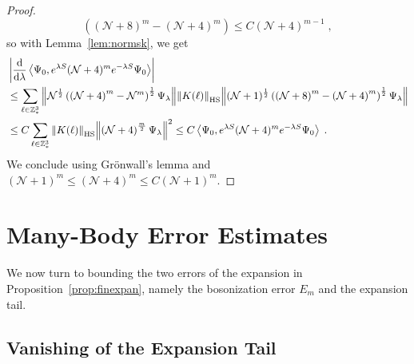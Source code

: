 \documentclass[12pt,a4paper]{article}
\numberwithin{equation}{section}
\newcommand{\cN}{\mathcal{N}}
\newcommand{\1}{\mathbb{I}}
\newcommand{\di}{\textnormal{d}}
\newcommand{\HS}{\mathrm{HS}}
\newcommand{\NN}{\mathcal{N}}
\newcommand{\half}{\frac{1}{2}}
\newcommand{\eva}[1]{\left\langle #1 \right\rangle}
\theoremstyle{plain}
\theoremstyle{definition}
\theoremstyle{remark}
\theoremstyle{plain}
\theoremstyle{definition}
\theoremstyle{remark}
\begin{document}
\begin{proof}
\begin{equation}
	\left( \left(\NN+8\right)^m - \left(\NN+4\right)^m \right)
	\leq C \left(\NN+4\right)^{m-1} \;,
\end{equation}
so with Lemma~\ref{lem:normsk}, we get
\begin{align}
	&\left|\frac{\di}{\di\lambda}\eva{\Psi_0, e^{\lambda S} (\mathcal{N}+4)^m e^{-\lambda S} \Psi_0 }\right| \nonumber\\
	&\leq \sum_{\ell\in \mathbb{Z}^3_*}
		\norm{ \NN^\half \left( \left(\NN+4\right)^m - \NN^m \right)^\half \Psi_\lambda}
		\norm{K(\ell)}_{\HS}
		\norm{ (\NN+1)^\half \left( \left(\NN+8\right)^m - \left(\NN+4\right)^m \right)^\half \Psi_\lambda } \nonumber\\
	&\leq C \sum_{\ell\in \mathbb{Z}^3_*}
		\norm{K(\ell)}_{\HS}
		\norm{ \left(\NN+4\right)^\frac{m}{2} \Psi_\lambda}^2
	\leq C \eva{\Psi_0, e^{\lambda S} (\mathcal{N}+4)^m e^{-\lambda S} \Psi_0 } \;.
\end{align}
We conclude using Gr\"onwall's lemma and $ (\cN+1)^m \le (\cN+4)^m \le C (\cN+1)^m $.
\end{proof}

\section{Many-Body Error Estimates}
\label{subsec:manybody_estimates}

We now turn to bounding the two errors of the expansion in Proposition~\ref{prop:finexpan}, namely the bosonization error $ E_m $ and the expansion tail.


\subsection{Vanishing of the Expansion Tail}
\label{subsec:tailestimate}
\end{document}
